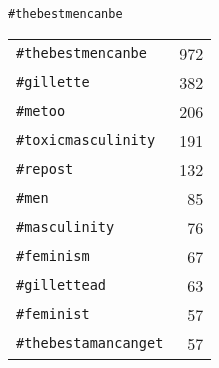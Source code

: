 \centering
\captionsetup{justification=centering,singlelinecheck=off}
\caption{
  \texttt{\#thebestmencanbe}
}
\begin{tabular}{lr}
\texttt{\#thebestmencanbe}   & 972 \\
\texttt{\#gillette}          & 382 \\
\texttt{\#metoo}             & 206 \\
\texttt{\#toxicmasculinity}  & 191 \\
\texttt{\#repost}            & 132 \\
\texttt{\#men}               & 85 \\
\texttt{\#masculinity}       & 76 \\
\texttt{\#feminism}          & 67 \\
\texttt{\#gillettead}        & 63 \\
\texttt{\#feminist}          & 57 \\
\texttt{\#thebestamancanget} & 57

\end{tabular}
